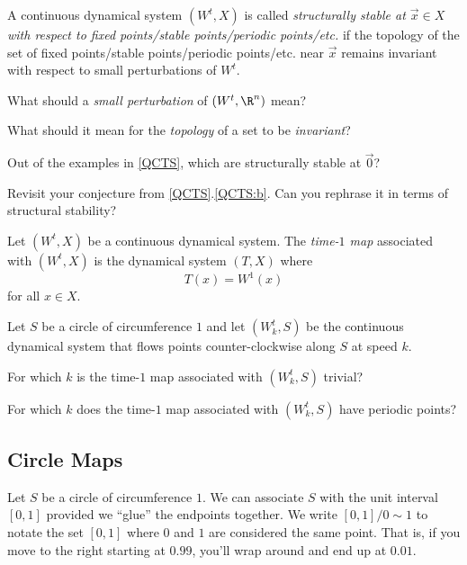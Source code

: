 		
	\begin{definition}
		A continuous dynamical system $(W^t,X)$ is called \emph{structurally stable at $\vec x\in X$
		with respect to fixed points/stable points/periodic points/etc.} if the topology of
		the set of fixed points/stable points/periodic points/etc. near $\vec x$ remains invariant with respect
		to small perturbations of $W^t$.
	\end{definition}

	\question
	\begin{parts}
		\item What should a \emph{small perturbation} of $(W^t,\R^n)$ mean?
		\item What should it mean for the \emph{topology} of a set to be \emph{invariant}?
		\item Out of the examples in \ref{QCTS}, which are structurally stable at $\vec 0$?
		\item Revisit your conjecture from \ref{QCTS}.\ref{QCTS:b}. Can you rephrase it in terms of structural
			stability?
	\end{parts}

	\newpage
	\begin{definition}
		Let $(W^t,X)$ be a continuous dynamical system. The \emph{time-$1$ map}
		associated with $(W^t,X)$ is the dynamical system $(T,X)$ where
		\[
			T(x) = W^1(x)
		\]
		for all $x\in X$.
	\end{definition}

	\question
	\label{QCIRCCONT}
	Let $S$ be a circle of circumference $1$ and let $(W^t_k,S)$ be the continuous dynamical
	system that flows points counter-clockwise along $S$ at speed $k$.
	\begin{parts}
		\item For which $k$ is the time-$1$ map associated with $(W^t_k,S)$ trivial?
		\item For which $k$ does the time-$1$ map associated with $(W^t_k,S)$ have periodic points?
	\end{parts}

	\subsection*{Circle Maps}
	Let $S$ be a circle of circumference $1$. We can associate $S$ with the unit interval $[0,1]$ provided
	we ``glue'' the endpoints together. We write $[0,1]/0\sim1$ to notate the set $[0,1]$ where $0$ and $1$
	are considered the same point. That is, if you move to the right starting at $0.99$, you'll wrap around
	and end up at $0.01$.

